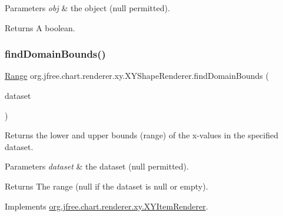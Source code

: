\begin{DoxyParams}{Parameters}
{\em obj} & the object ({\ttfamily null} permitted).\\
\hline
\end{DoxyParams}
\begin{DoxyReturn}{Returns}
A boolean. 
\end{DoxyReturn}
\mbox{\label{classorg_1_1jfree_1_1chart_1_1renderer_1_1xy_1_1_x_y_shape_renderer_a84f6e58c06ea03d5084f82935f277fca}} 
\subsubsection{\texorpdfstring{find\+Domain\+Bounds()}{findDomainBounds()}}
{\footnotesize\ttfamily \mbox{\hyperlink{classorg_1_1jfree_1_1data_1_1_range}{Range}} org.\+jfree.\+chart.\+renderer.\+xy.\+X\+Y\+Shape\+Renderer.\+find\+Domain\+Bounds (\begin{DoxyParamCaption}\item[{\mbox{\hyperlink{interfaceorg_1_1jfree_1_1data_1_1xy_1_1_x_y_dataset}{X\+Y\+Dataset}}}]{dataset }\end{DoxyParamCaption})}

Returns the lower and upper bounds (range) of the x-\/values in the specified dataset.


\begin{DoxyParams}{Parameters}
{\em dataset} & the dataset ({\ttfamily null} permitted).\\
\hline
\end{DoxyParams}
\begin{DoxyReturn}{Returns}
The range ({\ttfamily null} if the dataset is {\ttfamily null} or empty). 
\end{DoxyReturn}


Implements \mbox{\hyperlink{interfaceorg_1_1jfree_1_1chart_1_1renderer_1_1xy_1_1_x_y_item_renderer_a77925018c73214f58daac73147ba5e52}{org.\+jfree.\+chart.\+renderer.\+xy.\+X\+Y\+Item\+Renderer}}.

\mbox{\label{classorg_1_1jfree_1_1chart_1_1renderer_1_1xy_1_1_x_y_shape_renderer_a45964746fcd8d2c928b9cb5932429600}} 
